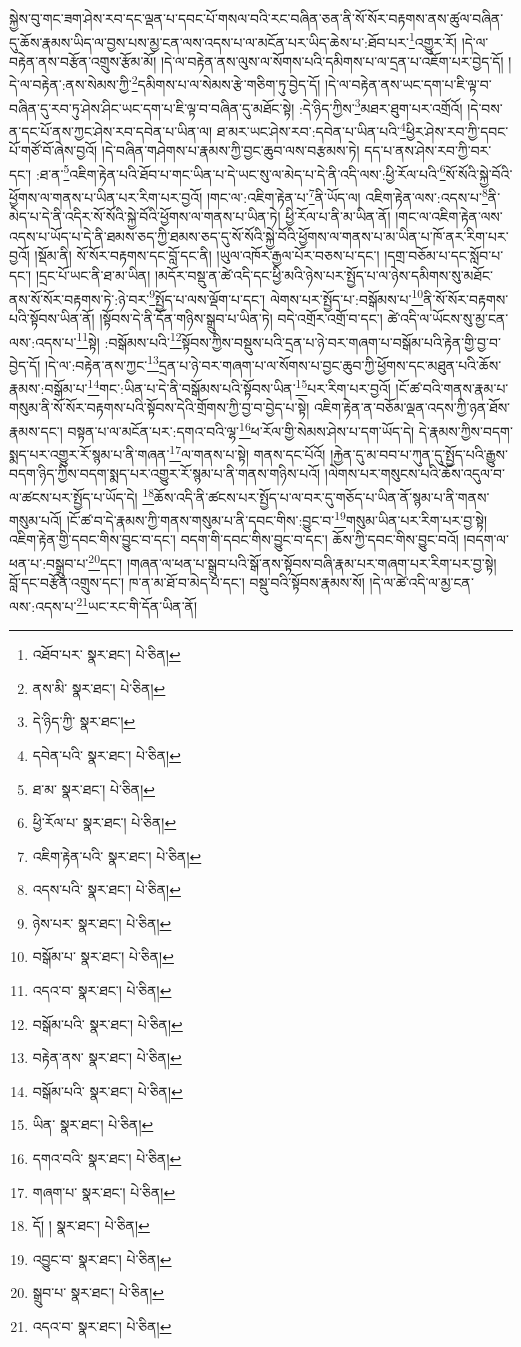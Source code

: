སྐྱེས་བུ་གང་ཟག་ཤེས་རབ་དང་ལྡན་པ་དབང་པོ་གསལ་བའི་རང་བཞིན་ཅན་ནི་སོ་སོར་བརྟགས་ནས་ཚུལ་བཞིན་དུ་ཆོས་རྣམས་ཡིད་ལ་བྱས་པས་མྱ་ངན་ལས་འདས་པ་ལ་མངོན་པར་ཡིད་ཆེས་པ་:ཐོབ་པར་\footnote{འཐོབ་པར་  སྣར་ཐང་།  པེ་ཅིན། }འགྱུར་རོ། །དེ་ལ་བརྟེན་ནས་བརྩོན་འགྲུས་རྩོམ་མོ། །དེ་ལ་བརྟེན་ནས་ལུས་ལ་སོགས་པའི་དམིགས་པ་ལ་དྲན་པ་འཇོག་པར་བྱེད་དོ། །དེ་ལ་བརྟེན་:ནས་སེམས་ཀྱི་\footnote{ནས་མི་  སྣར་ཐང་།  པེ་ཅིན། }དམིགས་པ་ལ་སེམས་རྩེ་གཅིག་ཏུ་བྱེད་དོ། །དེ་ལ་བརྟེན་ནས་ཡང་དག་པ་ཇི་ལྟ་བ་བཞིན་དུ་རབ་ཏུ་ཤེས་ཤིང་ཡང་དག་པ་ཇི་ལྟ་བ་བཞིན་དུ་མཐོང་སྟེ། :དེ་ཉིད་ཀྱིས་\footnote{དེ་ཉིད་ཀྱི་  སྣར་ཐང་། }མཐར་ཐུག་པར་འགྲོའོ། །དེ་བས་ན་དང་པོ་ནས་ཀྱང་ཤེས་རབ་དབེན་པ་ཡིན་ལ། ཐ་མར་ཡང་ཤེས་རབ་:དབེན་པ་ཡིན་པའི་\footnote{དབེན་པའི་  སྣར་ཐང་།  པེ་ཅིན། }ཕྱིར་ཤེས་རབ་ཀྱི་དབང་པོ་གཙོ་བོ་ཞེས་བྱའོ། །དེ་བཞིན་གཤེགས་པ་རྣམས་ཀྱི་བྱང་ཆུབ་ལས་བརྩམས་ཏེ། དད་པ་ནས་ཤེས་རབ་ཀྱི་བར་དང་། :ཐ་ན་\footnote{ཐ་མ་  སྣར་ཐང་།  པེ་ཅིན། }འཇིག་རྟེན་པའི་ཐོབ་པ་གང་ཡིན་པ་དེ་ཡང་སུ་ལ་མེད་པ་དེ་ནི་འདི་ལས་:ཕྱི་རོལ་པའི་\footnote{ཕྱི་རོལ་པ་  སྣར་ཐང་།  པེ་ཅིན། }སོ་སོའི་སྐྱེ་བོའི་ཕྱོགས་ལ་གནས་པ་ཡིན་པར་རིག་པར་བྱའོ། །གང་ལ་:འཇིག་རྟེན་པ་\footnote{འཇིག་རྟེན་པའི་  སྣར་ཐང་།  པེ་ཅིན། }ནི་ཡོད་ལ། འཇིག་རྟེན་ལས་:འདས་པ་\footnote{འདས་པའི་  སྣར་ཐང་།  པེ་ཅིན། }ནི་མེད་པ་དེ་ནི་འདིར་སོ་སོའི་སྐྱེ་བོའི་ཕྱོགས་ལ་གནས་པ་ཡིན་ཏེ། ཕྱི་རོལ་པ་ནི་མ་ཡིན་ནོ། །གང་ལ་འཇིག་རྟེན་ལས་འདས་པ་ཡོད་པ་དེ་ནི་ཐམས་ཅད་ཀྱི་ཐམས་ཅད་དུ་སོ་སོའི་སྐྱེ་བོའི་ཕྱོགས་ལ་གནས་པ་མ་ཡིན་པ་ཁོ་ནར་རིག་པར་བྱའོ། །སྡོམ་ནི། སོ་སོར་བརྟགས་དང་བློ་དང་ནི། །ཡུལ་འཁོར་རྒྱལ་པོར་བཅས་པ་དང་། །དགྲ་བཅོམ་པ་དང་སློབ་པ་དང་། །དྲང་པོ་ཡང་ནི་ཐ་མ་ཡིན། །མདོར་བསྡུ་ན་ཚེ་འདི་དང་ཕྱི་མའི་ཉེས་པར་སྤྱོད་པ་ལ་ཉེས་དམིགས་སུ་མཐོང་ནས་སོ་སོར་བརྟགས་ཏེ་:ཉེ་བར་\footnote{ཉེས་པར་  སྣར་ཐང་།  པེ་ཅིན། }སྤྱོད་པ་ལས་ལྡོག་པ་དང་། ལེགས་པར་སྤྱོད་པ་:བསྒོམས་པ་\footnote{བསྒོམ་པ་  སྣར་ཐང་།  པེ་ཅིན། }ནི་སོ་སོར་བརྟགས་པའི་སྟོབས་ཡིན་ནོ། །སྟོབས་དེ་ནི་དོན་གཉིས་སྒྲུབ་པ་ཡིན་ཏེ། བདེ་འགྲོར་འགྲོ་བ་དང་། ཚེ་འདི་ལ་ཡོངས་སུ་མྱ་ངན་ལས་:འདས་པ་\footnote{འདའ་བ་  སྣར་ཐང་།  པེ་ཅིན། }སྟེ། :བསྒོམས་པའི་\footnote{བསྒོམ་པའི་  སྣར་ཐང་།  པེ་ཅིན། }སྟོབས་ཀྱིས་བསྡུས་པའི་དྲན་པ་ཉེ་བར་གཞག་པ་བསྒོམ་པའི་རྟེན་གྱི་བྱ་བ་བྱེད་དོ། །དེ་ལ་:བརྟེན་ནས་ཀྱང་\footnote{བརྟེན་ནས་  སྣར་ཐང་།  པེ་ཅིན། }དྲན་པ་ཉེ་བར་གཞག་པ་ལ་སོགས་པ་བྱང་ཆུབ་ཀྱི་ཕྱོགས་དང་མཐུན་པའི་ཆོས་རྣམས་:བསྒོམ་པ་\footnote{བསྒོམ་པའི་  སྣར་ཐང་།  པེ་ཅིན། }གང་:ཡིན་པ་དེ་ནི་བསྒོམས་པའི་སྟོབས་ཡིན་\footnote{ཡིན་  སྣར་ཐང་།  པེ་ཅིན། }པར་རིག་པར་བྱའོ། །ངོ་ཚ་བའི་གནས་རྣམ་པ་གསུམ་ནི་སོ་སོར་བརྟགས་པའི་སྟོབས་དེའི་གྲོགས་ཀྱི་བྱ་བ་བྱེད་པ་སྟེ། འཇིག་རྟེན་ན་བཅོམ་ལྡན་འདས་ཀྱི་ཉན་ཐོས་རྣམས་དང་། བསྟན་པ་ལ་མངོན་པར་:དགའ་བའི་ལྷ་\footnote{དགའ་བའི་  སྣར་ཐང་།  པེ་ཅིན། }ཕ་རོལ་གྱི་སེམས་ཤེས་པ་དག་ཡོད་དེ། དེ་རྣམས་ཀྱིས་བདག་སྨད་པར་འགྱུར་རོ་སྙམ་པ་ནི་གཞན་\footnote{གཞག་པ་  སྣར་ཐང་།  པེ་ཅིན། }ལ་གནས་པ་སྟེ། གནས་དང་པོའོ། །རྐྱེན་དུ་མ་བབ་པ་ཀུན་དུ་སྤྱོད་པའི་རྒྱུས་བདག་ཉིད་ཀྱིས་བདག་སྨད་པར་འགྱུར་རོ་སྙམ་པ་ནི་གནས་གཉིས་པའོ། །ལེགས་པར་གསུངས་པའི་ཆོས་འདུལ་བ་ལ་ཚངས་པར་སྤྱོད་པ་ཡོད་དེ། \footnote{དོ། །   སྣར་ཐང་།  པེ་ཅིན། }ཆོས་འདི་ནི་ཚངས་པར་སྤྱོད་པ་ལ་བར་དུ་གཅོད་པ་ཡིན་ནོ་སྙམ་པ་ནི་གནས་གསུམ་པའོ། །ངོ་ཚ་བ་དེ་རྣམས་ཀྱི་གནས་གསུམ་པ་ནི་དབང་གིས་:བྱུང་བ་\footnote{འབྱུང་བ་  སྣར་ཐང་།  པེ་ཅིན། }གསུམ་ཡིན་པར་རིག་པར་བྱ་སྟེ། འཇིག་རྟེན་གྱི་དབང་གིས་བྱུང་བ་དང་། བདག་གི་དབང་གིས་བྱུང་བ་དང་། ཆོས་ཀྱི་དབང་གིས་བྱུང་བའོ། །བདག་ལ་ཕན་པ་:བསྒྲུབ་པ་\footnote{སྒྲུབ་པ་  སྣར་ཐང་།  པེ་ཅིན། }དང་། །གཞན་ལ་ཕན་པ་སྒྲུབ་པའི་སྒོ་ནས་སྟོབས་བཞི་རྣམ་པར་གཞག་པར་རིག་པར་བྱ་སྟེ། བློ་དང་བརྩོན་འགྲུས་དང་། ཁ་ན་མ་ཐོ་བ་མེད་པ་དང་། བསྡུ་བའི་སྟོབས་རྣམས་སོ། །དེ་ལ་ཚེ་འདི་ལ་མྱ་ངན་ལས་:འདས་པ་\footnote{འདའ་བ་  སྣར་ཐང་།  པེ་ཅིན། }ཡང་རང་གི་དོན་ཡིན་ནོ། 